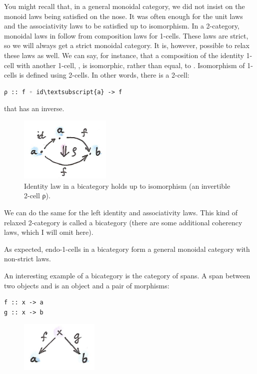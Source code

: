 You might recall that, in a general monoidal category, we did not insist
on the monoid laws being satisfied on the nose. It was often enough for
the unit laws and the associativity laws to be satisfied up to
isomorphism. In a 2-category, monoidal laws in  follow
from composition laws for 1-cells. These laws are strict, so we will
always get a strict monoidal category. It is, however, possible to relax
these laws as well. We can say, for instance, that a composition of the
identity 1-cell  with another 1-cell,
, is isomorphic, rather than equal,
to . Isomorphism of 1-cells is defined using 2-cells. In other
words, there is a 2-cell:

\begin{Verbatim}[commandchars=\\\{\}]
ρ :: f ◦ id\textsubscript{a} -> f
\end{Verbatim}
that has an inverse.

\begin{figure}[H]
\centering
\includegraphics[width=1.70833in]{images/bicat.png}
\caption{Identity law in a bicategory holds up to isomorphism (an invertible
2-cell ρ).}
\end{figure}

\noindent
We can do the same for the left identity and associativity laws. This
kind of relaxed 2-category is called a bicategory (there are some
additional coherency laws, which I will omit here).

As expected, endo-1-cells in a bicategory form a general monoidal
category with non-strict laws.

An interesting example of a bicategory is the category of spans. A span
between two objects  and  is an object 
and a pair of morphisms:

\begin{Verbatim}[commandchars=\\\{\}]
f :: x -> a
g :: x -> b
\end{Verbatim}

\begin{figure}[H]
\centering
\includegraphics[width=1.46875in]{images/span.png}
\end{figure}

